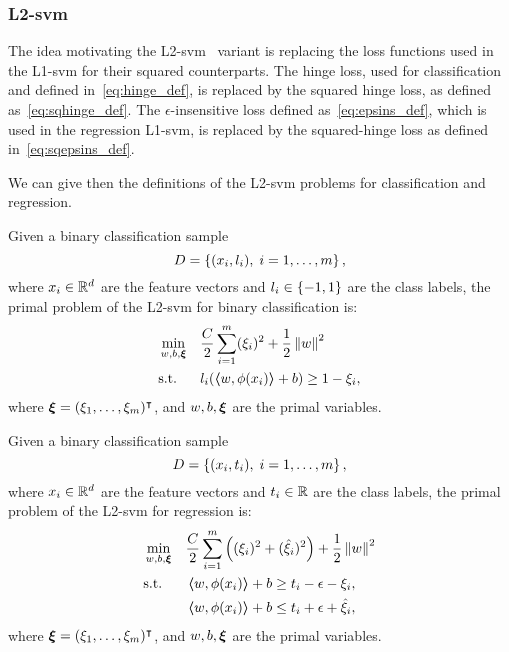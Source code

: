 \subsubsection*{L2-\acrshort{svm}}
The idea motivating the L2-\acrshort{svm}~\citep{Burges98} variant is replacing the loss functions used in the L1-\acrshort{svm} for their squared counterparts. 
The hinge loss, used for classification and defined in~\eqref{eq:hinge_def}, is replaced by the squared hinge loss, as defined as~\eqref{eq:sqhinge_def}.
The $\epsilon$-insensitive loss defined as~\eqref{eq:epsins_def}, which is used in the regression L1-\acrshort{svm}, is replaced by the squared-hinge loss as defined in~\eqref{eq:sqepsins_def}.
%

We can give then the definitions of the L2-\acrshort{svm} problems for classification and regression.
\begin{definition}
    Given a binary classification sample
    $$ D = \left\{(x_i, l_i), \; i=1, \ldots, m\right\} ,$$
    where $x_i \in \mathbb{R}^d$ are the feature vectors and $l_i \in \left\{-1, 1\right\}$ are the class labels, 
    the primal problem of the L2-\acrshort{svm} for binary classification is:
    \begin{equation}
        \label{eq:l2_primal_clas}
        \begin{aligned}
            &\min_{w, b, \fv{\xi}} & & \frac{C}{2} \sum_{i=1}^m (\xi_i)^2 + \frac{1}{2} \norm{w}^2 \\
            & \text{s.t.} & & l_i (\dotp{w}{\phi(x_i)} + b) \geq 1 - \xi_i , 
        \end{aligned}  
    \end{equation}
    where $\bm{\xi} = (\xi_1, \ldots, \xi_m)^\intercal$, and $w, b, \bm{\xi}$ are the primal variables.
\end{definition}
%
\begin{definition}
    Given a binary classification sample
    $$ D = \left\{(x_i, t_i), \; i=1, \ldots, m\right\} ,$$
    where $x_i \in \mathbb{R}^d$ are the feature vectors and $t_i \in \mathbb{R}$ are the class labels, 
    the primal problem of the L2-\acrshort{svm} for regression is:
    \begin{equation}
        \label{eq:l2_primal_reg}
        \begin{aligned}
            &\min_{w, b, \fv{\xi}} & & \frac{C}{2} \sum_{i=1}^m \left((\xi_i)^2 + (\hat{\xi}_i)^2 \right) + \frac{1}{2} \norm{w}^2 \\
            & \text{s.t.} & & \dotp{w}{\phi(x_i)} + b \geq t_i - \epsilon - \xi_i  , \\
            & & & \dotp{w}{\phi(x_i)} + b \leq t_i + \epsilon + \hat{\xi}_i , 
        \end{aligned}  
    \end{equation}
    where $\bm{\xi} = (\xi_1, \ldots, \xi_m)^\intercal$, and $w, b, \bm{\xi}$ are the primal variables.
\end{definition}
